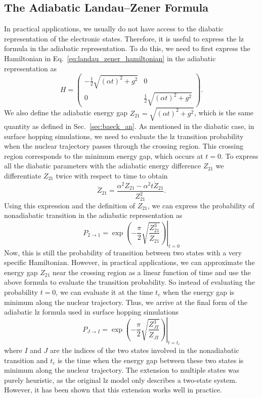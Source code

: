 \subsection{The Adiabatic Landau--Zener Formula}
In practical applications, we usually do not have access to the diabatic representation of the electronic states. Therefore, it is useful to express the \gls{lz} formula in the adiabatic representation. To do this, we need to first express the Hamiltonian in Eq.~\eqref{eq:landau_zener_hamiltonian} in the adiabatic representation as
\begin{equation}
H=\begin{pmatrix}
-\frac{1}{2}\sqrt{(\alpha t)^2+g^2}&0\\
0&\frac{1}{2}\sqrt{(\alpha t)^2+g^2}
\end{pmatrix}.
\end{equation}
We also define the adiabatic energy gap $Z_{21}=\sqrt{(\alpha t)^2+g^2}$, which is the same quantity as defined in Sec.~\ref{sec:baeck_an}. As mentioned in the diabatic case, in surface hopping simulations, we need to evaluate the \gls{lz} transition probability when the nuclear trajectory passes through the crossing region. This crossing region corresponds to the minimum energy gap, which occurs at $t=0$. To express all the diabatic parameters with the adiabatic energy difference $Z_{21}$ we differentiate $Z_{21}$ twice with respect to time to obtain
\begin{equation}
\ddot Z_{21}=\frac{\alpha^2Z_{21}-\alpha^2t\dot Z_{21}}{Z_{21}^2}.
\end{equation}
Using this expression and the definition of $Z_{21}$, we can express the probability of nonadiabatic transition in the adiabatic representation as
\begin{equation}\label{eq:landau_zener_adiabatic_2to1}
P_{2\to1}=\left.\exp\left(-\frac{\pi}{2}\sqrt{\frac{Z_{21}^3}{\ddot Z_{21}}}\right)\right\rvert_{t=0}
\end{equation}
Now, this is still the probability of transition between two states with a very specific Hamiltonian. However, in practical applications, we can approximate the energy gap $Z_{21}$ near the crossing region as a linear function of time and use the above formula to evaluate the transition probability. So instead of evaluating the probability $t=0$, we can evaluate it at the time $t_c$ when the energy gap is minimum along the nuclear trajectory. Thus, we arrive at the final form of the adiabatic \gls{lz} formula used in surface hopping simulations\supercite{10.1103/PhysRevA.84.014701}
\begin{equation}\label{eq:landau_zener_adiabatic}
P_{J\to I}=\left.\exp\left(-\frac{\pi}{2}\sqrt{\frac{Z_{JI}^3}{\ddot Z_{JI}}}\right)\right\rvert_{t=t_c}
\end{equation}
where $I$ and $J$ are the indices of the two states involved in the nonadiabatic transition and $t_c$ is the time when the energy gap between these two states is minimum along the nuclear trajectory. The extension to multiple states was purely heuristic, as the original \gls{lz} model only describes a two-state system. However, it has been shown that this extension works well in practice.\supercite{10.1021/acs.jctc.0c00512}

